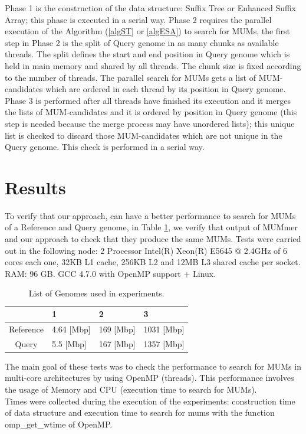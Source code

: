 \documentclass[runningheads,a4paper]{llncs}
\begin{document}
Phase 1 is the construction of the data structure: Suffix Tree or Enhanced Suffix Array; this phase is executed in a serial way. Phase 2 requires the parallel execution of the Algorithm (\ref{algST} or \ref{algESA}) to search for MUMs, the first step in Phase 2 is the split of Query genome in as many chunks as available threads. The split defines the start and end position in Query genome which is held in main memory and shared by all threads. The chunk size is fixed according to the number of threads. The parallel search for MUMs gets a list of MUM-candidates which are ordered in each thread by its position in Query genome. Phase 3 is performed after all threads have finished its execution and it merges the lists of MUM-candidates and it is ordered by position in Query genome (this step is needed because the merge process may have unordered lists); this unique list is checked to discard those MUM-candidates which are not unique in the Query genome. This check is performed in a serial way.
\section{Results}
To verify that our approach, can have a better performance to search for MUMs of a Reference and Query genome, in Table \ref{genomes}, we verify that output of MUMmer and our approach to check that they produce the same MUMs. Tests were carried out in the following node: 2 Processor Intel(R) Xeon(R) E5645 @ 2.4GHz of 6 cores each one, 32KB L1 cache, 256KB L2 and 12MB L3 shared cache per socket. RAM: 96 GB. GCC 4.7.0 with OpenMP support + Linux. 
\begin{table} 
\centering
\caption{List of Genomes used in experiments.}
\label{genomes}
\begin{tabular}{|c|l|l|l|} \hline
  & 1 & 2 & 3 \\ \hline
  Reference & 4.64 [Mbp] & 169 [Mbp] & 1031 [Mbp] \\ \hline
  Query & 5.5 [Mbp] & 167 [Mbp] & 1357 [Mbp] \\ 
  \hline
\end{tabular}
\end{table}
The main goal of these tests was to check the performance to search for MUMs in multi-core architectures by using OpenMP (threads). This performance involves the usage of Memory and CPU (execution time to search for MUMs).\\
Times were collected during the execution of the experiments: construction time of data structure and execution time to search for mums with the function omp\_get\_wtime of OpenMP.\\
\end{document}
